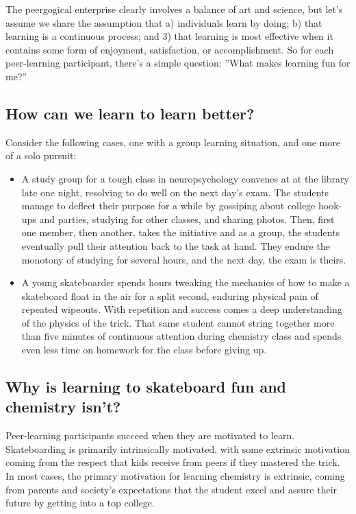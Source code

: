 The peergogical enterprise clearly involves a balance of art and
science, but let's assume we share the assumption that a) individuals
learn by doing; b) that learning is a continuous process; and 3) that
learning is most effective when it contains some form of enjoyment,
satisfaction, or accomplishment. So for each peer-learning participant,
there's a simple question: ''What makes learning fun for me?''

\subsection{How can we learn to learn better?}

Consider the following cases, one with a group learning situation, and
one more of a solo pursuit:

\begin{itemize}
\item
  A study group for a tough class in neuropsychology convenes at at the
  library late one night, resolving to do well on the next day's exam.
  The students manage to deflect their purpose for a while by gossiping
  about college hook-ups and parties, studying for other classes, and
  sharing photos. Then, first one member, then another, takes the
  initiative and as a group, the students eventually pull their
  attention back to the task at hand. They endure the monotony of
  studying for several hours, and the next day, the exam is theirs.
\item
  A young skateboarder spends hours tweaking the mechanics of how to
  make a skateboard float in the air for a split second, enduring
  physical pain of repeated wipeouts. With repetition and success comes
  a deep understanding of the physics of the trick. That same student
  cannot string together more than five minutes of continuous attention
  during chemistry class and spends even less time on homework for the
  class before giving up.
\end{itemize}
\subsection{Why is learning to skateboard fun and chemistry isn't?}

Peer-learning participants succeed when they are motivated to learn.
Skateboarding is primarily intrinsically motivated, with some extrinsic
motivation coming from the respect that kids receive from peers if they
mastered the trick. In most cases, the primary motivation for learning
chemistry is extrinsic, coming from parents and society's expectations
that the student excel and assure their future by getting into a top
college.

